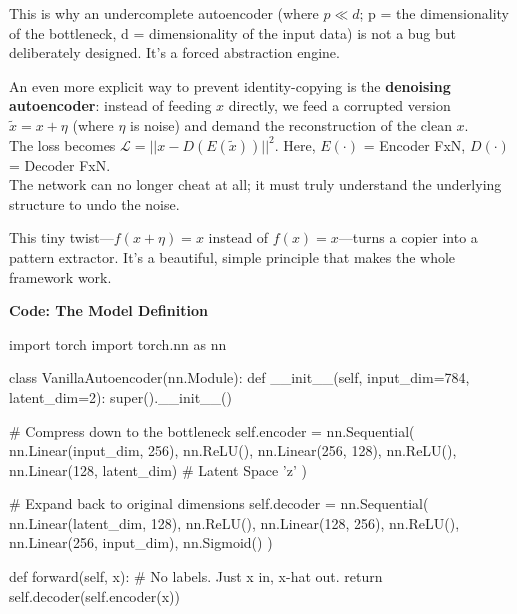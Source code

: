 \documentclass[11pt]{article}
\begin{document}
This is why an undercomplete autoencoder (where $p \ll d$; p = the dimensionality of the bottleneck, d = dimensionality of the input data) is not a bug but deliberately designed. It's a forced abstraction engine.

\vspace{0.2in}

An even more explicit way to prevent identity-copying is the \textbf{denoising autoencoder}: instead of feeding $x$ directly, we feed a corrupted version $\tilde{x} = x + \eta$ (where $\eta$ is noise) and demand the reconstruction of the clean $x$. \\
The loss becomes $\mathcal{L} = ||x - D(E(\tilde{x}))||^2$. Here, $E(\cdot)$ = Encoder FxN, $D(\cdot)$ = Decoder FxN.\\
The network can no longer cheat at all; it must truly understand the underlying structure to undo the noise.
\vspace{0.2in}

\begin{tcolorbox}[
    colback=brandlight,
    colframe=brandorange,
    arc=5pt,
    boxrule=0.8pt,
    left=15pt, right=15pt, top=10pt, bottom=10pt
]
\color{brandnavy}
This tiny twist—$f(x + \eta) = x$ instead of $f(x) = x$—turns a copier into a pattern extractor. It's a beautiful, simple principle that makes the whole framework work.
\end{tcolorbox}

\newpage


\vspace*{0.2in}

\begin{center}
{\Large\bfseries Code: The Model Definition}
\end{center}

\vspace{0.1in}

\begin{codebox}
import torch
import torch.nn as nn

class VanillaAutoencoder(nn.Module):
    def __init__(self, input_dim=784, latent_dim=2):
        super().__init__()
        
        # Compress down to the bottleneck
        self.encoder = nn.Sequential(
            nn.Linear(input_dim, 256),
            nn.ReLU(),
            nn.Linear(256, 128),
            nn.ReLU(),
            nn.Linear(128, latent_dim) # Latent Space 'z'
        )
        
        # Expand back to original dimensions
        self.decoder = nn.Sequential(
            nn.Linear(latent_dim, 128),
            nn.ReLU(),
            nn.Linear(128, 256),
            nn.ReLU(),
            nn.Linear(256, input_dim),
            nn.Sigmoid() 
        )

    def forward(self, x):
        # No labels. Just x in, x-hat out.
        return self.decoder(self.encoder(x))
\end{codebox}
\end{document}
